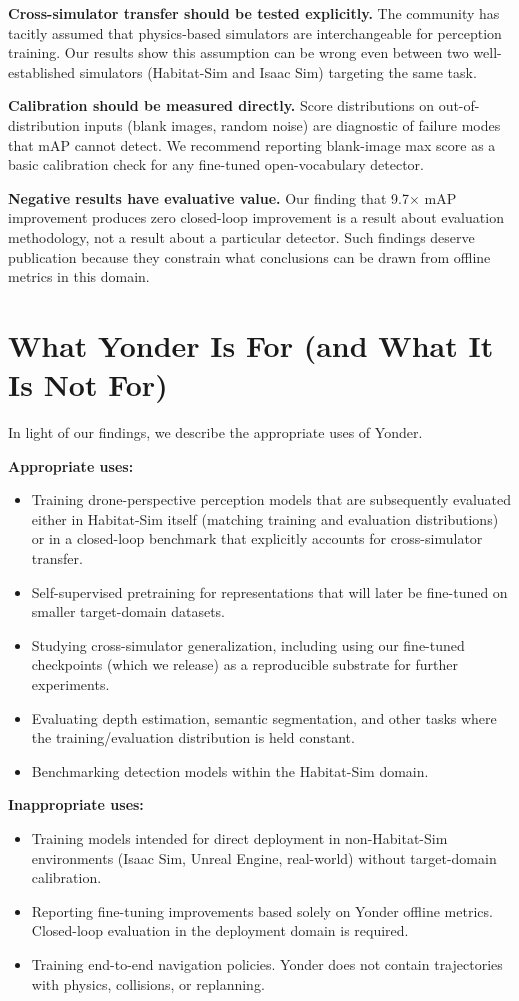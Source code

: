\documentclass{article}
\begin{document}
\textbf{Cross-simulator transfer should be tested explicitly.} The community has tacitly assumed that physics-based simulators are interchangeable for perception training. Our results show this assumption can be wrong even between two well-established simulators (Habitat-Sim and Isaac Sim) targeting the same task.

\textbf{Calibration should be measured directly.} Score distributions on out-of-distribution inputs (blank images, random noise) are diagnostic of failure modes that mAP cannot detect. We recommend reporting blank-image max score as a basic calibration check for any fine-tuned open-vocabulary detector.

\textbf{Negative results have evaluative value.} Our finding that 9.7$\times$ mAP improvement produces zero closed-loop improvement is a result about evaluation methodology, not a result about a particular detector. Such findings deserve publication because they constrain what conclusions can be drawn from offline metrics in this domain.

\section{What Yonder Is For (and What It Is Not For)}

In light of our findings, we describe the appropriate uses of Yonder.

\textbf{Appropriate uses:}
\begin{itemize}
\item Training drone-perspective perception models that are subsequently evaluated either in Habitat-Sim itself (matching training and evaluation distributions) or in a closed-loop benchmark that explicitly accounts for cross-simulator transfer.
\item Self-supervised pretraining for representations that will later be fine-tuned on smaller target-domain datasets.
\item Studying cross-simulator generalization, including using our fine-tuned checkpoints (which we release) as a reproducible substrate for further experiments.
\item Evaluating depth estimation, semantic segmentation, and other tasks where the training/evaluation distribution is held constant.
\item Benchmarking detection models within the Habitat-Sim domain.
\end{itemize}

\textbf{Inappropriate uses:}
\begin{itemize}
\item Training models intended for direct deployment in non-Habitat-Sim environments (Isaac Sim, Unreal Engine, real-world) without target-domain calibration.
\item Reporting fine-tuning improvements based solely on Yonder offline metrics. Closed-loop evaluation in the deployment domain is required.
\item Training end-to-end navigation policies. Yonder does not contain trajectories with physics, collisions, or replanning.
\end{itemize}
\end{document}

